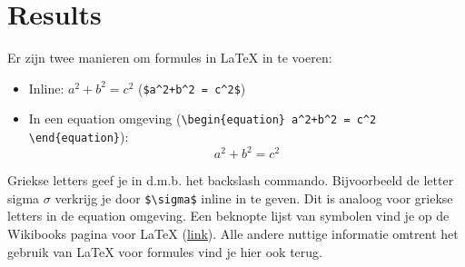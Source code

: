 \chapter{Results}

Er zijn twee manieren om formules in LaTeX in te voeren:

\begin{itemize}
	\item Inline: $a^2+b^2 = c^2$ (\verb|$a^2+b^2 = c^2$|)
	\item In een equation omgeving 	(\verb|\begin{equation}	a^2+b^2 = c^2	\end{equation}|):
	\begin{equation}
		a^2+b^2 = c^2
	\end{equation}

\end{itemize}

Griekse letters geef je in d.m.b. het backslash commando. Bijvoorbeeld de letter sigma $\sigma$ verkrijg je door \verb|$\sigma$| inline in te geven. Dit is analoog voor griekse letters in de equation omgeving. Een beknopte lijst van symbolen vind je op de Wikibooks pagina voor LaTeX (\href{https://nl.wikibooks.org/wiki/LaTeX/Wiskundige_formules}{link}). Alle andere nuttige informatie omtrent het gebruik van LaTeX voor formules vind je hier ook terug.
\cleardoublepage
